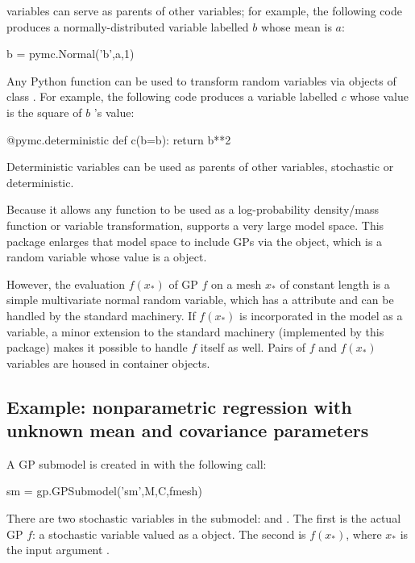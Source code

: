 \documentclass[article]{jss}
\begin{document}
 variables can serve as parents of other variables; for example, the following code produces a normally-distributed variable labelled $b$ whose mean is $a$:
\begin{CodeChunk}
\begin{CodeInput}
b = pymc.Normal('b',a,1)    
\end{CodeInput}
\end{CodeChunk}

Any Python function can be used to transform random variables via objects of class . For example, the following code produces a variable labelled $c$ whose value is the square of $b$ 's value:
\begin{CodeChunk}
\begin{CodeInput}
@pymc.deterministic
def c(b=b):
    return b**2
\end{CodeInput}
\end{CodeChunk}
Deterministic variables can be used as parents of other variables, stochastic or deterministic. 

Because it allows any  function to be used as a log-probability density/mass function or variable transformation,  supports a very large model space. This package enlarges that model space to include GPs via the  object, which is a random variable whose value is a  object.

However, the evaluation $f(x_*)$ of GP $f$ on a mesh $x_*$ of constant length is a simple multivariate normal random variable, which has a  attribute and can be handled by the standard machinery. If $f(x_*)$ is incorporated in the model as a variable, a minor extension to the standard machinery (implemented by this package) makes it possible to handle $f$ itself as well. Pairs of $f$ and $f(x_*)$ variables are housed in  container objects.

\subsection{Example: nonparametric regression with unknown mean and covariance parameters}\label{sub:BasicMCMC}

A GP submodel is created in  with the following call:
\begin{CodeChunk}
\begin{CodeInput}
sm = gp.GPSubmodel('sm',M,C,fmesh)
\end{CodeInput}
\end{CodeChunk}
There are two stochastic variables in the submodel:  and . The first is the actual GP $f$: a stochastic variable valued as a  object. The second is $f(x_*)$, where $x_*$ is the input argument .
\end{document}
